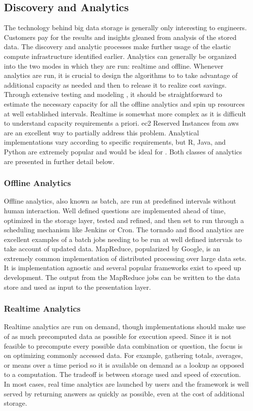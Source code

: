 \subsection{Discovery and Analytics}
The technology behind big data storage is generally only interesting to engineers. Customers pay for the results and insights gleaned from analysis of the stored data. The discovery and analytic processes make further usage of the elastic compute infrastructure identified earlier. Analytics can generally be organized into the two modes in which they are run: realtime and offline. Whenever analytics are run, it is crucial to design the algorithms to to take advantage of additional capacity as needed and then to release it to realize cost savings. Through extensive testing and modeling , it should be straightforward to estimate the necessary capacity for all the offline analytics and spin up resources at well established intervals. Realtime is somewhat more complex as it is difficult to understand capacity requirements a priori. \gls{ec2} Reserved Instances from \gls{aws} are an excellent way to partially address this problem. Analytical implementations vary according to specific requirements, but R, Java, and Python are extremely popular and would be ideal for \climatedge. Both classes of analytics are presented in further detail below.
\subsubsection{Offline Analytics}
Offline analytics, also known as batch, are run at predefined intervals without human interaction. Well defined questions are implemented ahead of time, optimized in the storage layer, tested and refined, and then set to run through a scheduling mechanism like Jenkins or Cron. The tornado and flood analytics are excellent examples of a batch jobs needing to be run at well defined intervals to take account of updated data. MapReduce, popularized by Google, is an extremely common implementation of distributed processing over large data sets. It is implementation agnostic and several popular frameworks exist to speed up development. The output from the MapReduce jobs can be written to the data store and used as input to the presentation layer.
\subsubsection{Realtime Analytics}
Realtime analytics are run on demand, though implementations should make use of as much precomputed data as possible for execution speed. Since it is not feasible to precompute every possible data combination or question, the focus is on optimizing commonly accessed data. For example, gathering totals, averages, or means over a time period so it is available on demand as a lookup as opposed to a computation. The tradeoff is between storage used and speed of execution. In most cases, real time analytics are launched by users and the framework is well served by returning answers as quickly as possible, even at the cost of additional storage.\\

